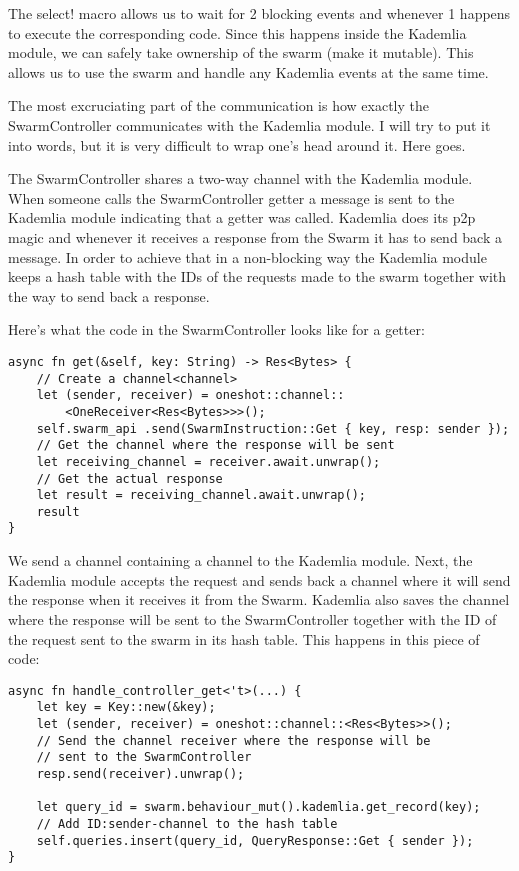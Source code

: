 \documentclass[ twoside,openright,titlepage,numbers=noenddot,headinclude,%
                footinclude=true,cleardoublepage=empty,abstractoff, %
                BCOR=5mm,paper=a4,fontsize=11pt,%
                ngerman,american,%
                ]{scrreprt}
\begin{document}
The select! macro allows us to wait for 2 blocking events and whenever 1 happens to execute the corresponding code.
Since this happens inside the Kademlia module, we can safely take ownership of the swarm (make it mutable).
This allows us to use the swarm and handle any Kademlia events at the same time.

The most excruciating part of the communication is how exactly
the SwarmController communicates with the Kademlia module.
I will try to put it into words, but it is very difficult to wrap one's head around it.
Here goes.

The SwarmController shares a two-way channel with the Kademlia module.
When someone calls the SwarmController getter a message is sent to the Kademlia module indicating
that a getter was called.
Kademlia does its p2p magic and whenever it receives a response from the Swarm it has to send back a message.
In order to achieve that in a non-blocking way the Kademlia module keeps a hash table with the IDs 
of the requests made to the swarm together with the way to send back a response.

Here's what the code in the SwarmController looks like for a getter:

\begin{verbatim}
async fn get(&self, key: String) -> Res<Bytes> {
    // Create a channel<channel>
    let (sender, receiver) = oneshot::channel::
        <OneReceiver<Res<Bytes>>>();
    self.swarm_api .send(SwarmInstruction::Get { key, resp: sender });
    // Get the channel where the response will be sent
    let receiving_channel = receiver.await.unwrap();
    // Get the actual response
    let result = receiving_channel.await.unwrap();
    result
}
\end{verbatim}

We send a channel containing a channel to the Kademlia module.
Next, the Kademlia module accepts the request and sends back a
channel where it will send the response when it receives it from the Swarm.
Kademlia also saves the channel where the response will be sent to the SwarmController
together with the ID of the request sent to the swarm in its hash table.
This happens in this piece of code:

\begin{verbatim}
async fn handle_controller_get<'t>(...) {
    let key = Key::new(&key);
    let (sender, receiver) = oneshot::channel::<Res<Bytes>>();
    // Send the channel receiver where the response will be
    // sent to the SwarmController
    resp.send(receiver).unwrap();

    let query_id = swarm.behaviour_mut().kademlia.get_record(key);
    // Add ID:sender-channel to the hash table
    self.queries.insert(query_id, QueryResponse::Get { sender });
}
\end{verbatim}
\end{document}
